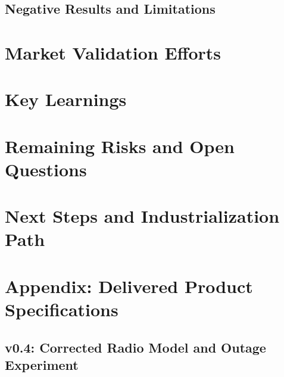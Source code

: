 \documentclass[11pt,a4paper]{article}
\begin{document}
\subsection{Negative Results and Limitations}

\section{Market Validation Efforts}

\section{Key Learnings}

\section{Remaining Risks and Open Questions}

\section{Next Steps and Industrialization Path}

\appendix
\section{Appendix: Delivered Product Specifications}

\subsection{v0.4: Corrected Radio Model and Outage Experiment}
\end{document}
